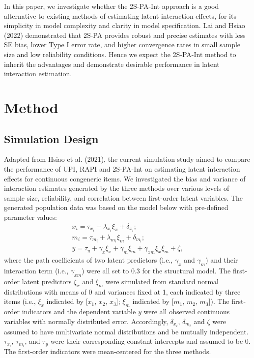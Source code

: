 \documentclass[
  man]{apa6}
\begin{document}
In this paper, we investigate whether the 2S-PA-Int approach is a good alternative to existing methods of estimating latent interaction effects, for its simplicity in model complexity and clarity in model specification. Lai and Hsiao (2022) demonstrated that 2S-PA provides robust and precise estimates with less SE bias, lower Type I error rate, and higher convergence rates in small sample size and low reliability conditions. Hence we expect the 2S-PA-Int method to inherit the advantages and demonstrate desirable performance in latent interaction estimation.

\hypertarget{method}{%
\section{Method}\label{method}}

\hypertarget{simulation-design}{%
\subsection{Simulation Design}\label{simulation-design}}

Adapted from Hsiao et al. (2021), the current simulation study aimed to compare the performance of UPI, RAPI and 2S-PA-Int on estimating latent interaction effects for continuous congeneric items. We investigated the bias and variance of interaction estimates generated by the three methods over various levels of sample size, reliability, and correlation between first-order latent variables. The generated population data was based on the model below with pre-defined parameter values:
\begin{equation}
\begin{gathered}
x_{i} =  \tau_{x_{i}} + \lambda_{x_{i}}\xi_{x} + \delta_{x_{i}};\\
m_{i} =  \tau_{m_{i}} + \lambda_{m_{i}}\xi_{m} + \delta_{m_{i}};\\
y =  \tau_{y} + \gamma_{x}\xi_{x} + \gamma_{m}\xi_{m} + \gamma_{xm}\xi_{x}\xi_{m} + \zeta,
\end{gathered}
\end{equation}
where the path coefficients of two latent predictors (i.e., \(\gamma_{x}\) and \(\gamma_{m}\)) and their interaction term (i.e., \(\gamma_{xm}\)) were all set to 0.3 for the structural model. The first-order latent predictors \(\xi_{x}\) and \(\xi_{m}\) were simulated from standard normal distributions with means of 0 and variances fixed at 1, each indicated by three items (i.e., \(\xi_{x}\) indicated by {[}\(x_{1}\), \(x_{2}\), \(x_{3}\){]}; \(\xi_{m}\) indicated by {[}\(m_{1}\), \(m_{2}\), \(m_{3}\){]}). The first-order indicators and the dependent variable \(y\) were all observed continuous variables with normally distributed error. Accordingly, \(\delta_{x_{i}}\), \(\delta_{m_{i}}\) and \(\zeta\) were assumed to have multivariate normal distributions and be mutually independent. \(\tau_{x_{i}}\), \(\tau_{m_{i}}\), and \(\tau_{y}\) were their corresponding constant intercepts and assumed to be 0. The first-order indicators were mean-centered for the three methods.
\end{document}
